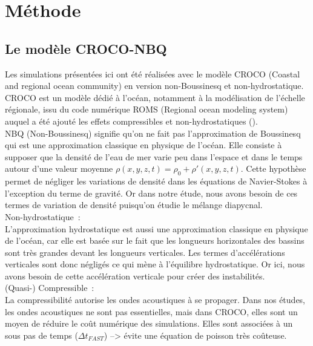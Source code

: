 \documentclass[a4paper,12pt]{article}
\begin{document}
\newpage
\section{Méthode}

    \subsection{Le modèle CROCO-NBQ}
    
    Les simulations présentées ici ont été réalisées avec le modèle CROCO (Coastal and regional ocean community) en version non-Boussinesq et non-hydrostatique.
    CROCO est un modèle dédié à l'océan, notamment à la modélisation de l'échelle régionale, issu du code numérique ROMS (Regional ocean modeling system) auquel a été ajouté les effets compressibles et non-hydrostatiques (\citep{auclair_non-hydrostatic_2018}). \\
    \newline
    NBQ (Non-Boussinesq) signifie qu'on ne fait pas l'approximation de Boussinesq qui est une approximation classique en physique de l'océan. Elle consiste à supposer que la densité de l'eau de mer varie peu dans l'espace et dans le temps autour d'une valeur moyenne $\rho(x,y,z,t)=\rho_{0}+\rho'(x,y,z,t)$. Cette hypothèse permet de négliger les variations de densité dans les équations de Navier-Stokes à l'exception du terme de gravité. Or dans notre étude, nous avons besoin de ces termes de variation de densité puisqu'on étudie le mélange diapycnal. \\
    \newline
    Non-hydrostatique :\\
    L'approximation hydrostatique est aussi une approximation classique en physique de l'océan, car elle est basée sur le fait que les longueurs horizontales des bassins sont très grandes devant les longueurs verticales. Les termes d'accélérations verticales sont donc négligés ce qui mène à l'équilibre hydrostatique. Or ici, nous avons besoin de cette accélération verticale pour créer des instabilités. \\
    \newline
    (Quasi-) Compressible :\\ 
    La compressibilité autorise les ondes acoustiques à se propager. Dans nos études, les ondes acoustiques ne sont pas essentielles, mais dans CROCO, elles sont un moyen de réduire le coût numérique des simulations. Elles sont associées à un sous pas de temps ($\Delta t_{FAST}$) --> évite une équation de poisson très coûteuse. \\
\end{document}
